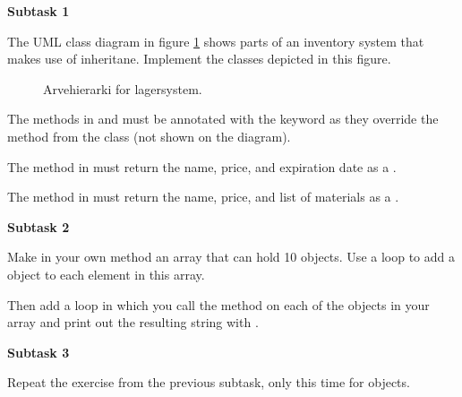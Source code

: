\textbf{Subtask 1}

The UML class diagram in figure \ref{inheritance:inventory:uml} shows parts of an inventory system that makes use of inheritane. Implement the classes depicted in this figure.

\begin{figure}[tbp]
  \caption{\label{inheritance:inventory:uml} Arvehierarki for lagersystem.}
\end{figure}

The  methods in  and  must be annotated with the  keyword as they override the method from the  class (not shown on the diagram).

The  method in  must return the name, price, and expiration date as a .

The  method in  must return the name, price, and list of materials as a .

\textbf{Subtask 2}

Make in your own  method an array that can hold 10  objects. Use a loop to add a  object to each element in this array.

Then add a loop in which you call the  method on each of the  objects in your array and print out the resulting string with .

\textbf{Subtask 3}

Repeat the exercise from the previous subtask, only this time for  objects.




